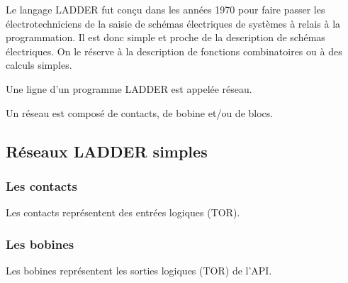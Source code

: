 
Le langage LADDER fut conçu dans les années 1970 pour faire passer les électrotechniciens de la saisie de schémas électriques de systèmes à relais  à la programmation.
Il est donc simple et proche de la description de schémas électriques.
On le réserve à la description de fonctions combinatoires ou à des calculs simples.

Une ligne d'un programme LADDER est appelée réseau.

Un réseau est composé de contacts, de bobine et/ou de blocs.

\subsection{Réseaux LADDER simples}

\subsubsection{Les contacts}

Les contacts représentent des entrées logiques (TOR).


\subsubsection{Les bobines}

Les bobines représentent les sorties logiques (TOR) de l'API.

